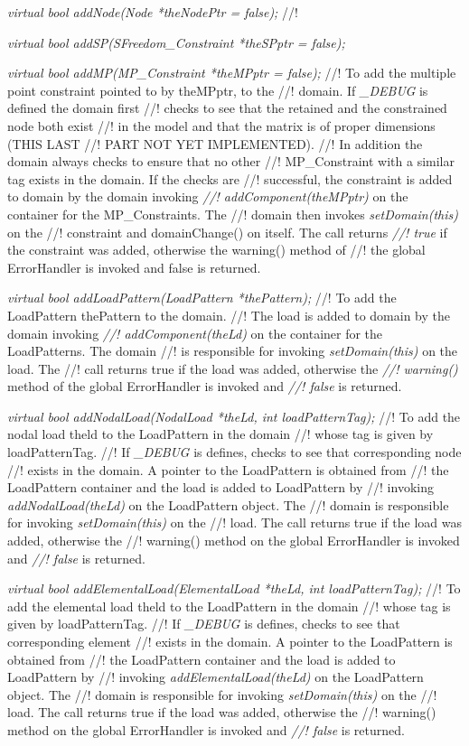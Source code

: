 {\em virtual bool addNode(Node *theNodePtr = false);}  
//! 


{\em virtual bool addSP(SFreedom\_Constraint *theSPptr = false);}  




{\em virtual bool addMP(MP\_Constraint *theMPptr = false);}  
//! To add the multiple point constraint pointed to by theMPptr, to the
//! domain. If {\em \_DEBUG} is defined the domain first
//! checks to see that the retained and the constrained node both exist
//! in the model and that the matrix is of proper dimensions (THIS LAST
//! PART NOT YET IMPLEMENTED). 
//! In addition the domain always checks to ensure that no other
//! MP\_Constraint with a similar tag exists in the domain. If the checks are
//! successful, the constraint is added to domain by the domain invoking {\em
//! addComponent(theMPptr)} on the container for the MP\_Constraints. The
//! domain then invokes {\em setDomain(this)} on the 
//! constraint and domainChange() on itself. The call returns {\em
//! true} if the constraint was added, otherwise the warning() method of
//! the global ErrorHandler is invoked and \p false is returned.


{\em virtual bool addLoadPattern(LoadPattern *thePattern);}   
//! To add the LoadPattern \p thePattern to the domain.
//! The load is added to domain by the domain invoking {\em
//! addComponent(theLd)} on the container for the LoadPatterns. The domain
//! is responsible for invoking {\em setDomain(this)} on the load. The
//! call returns \p true if the load was added, otherwise the {\em
//! warning()} method of the global ErrorHandler is invoked and {\em
//! false} is returned. 

{\em virtual bool addNodalLoad(NodalLoad *theLd, int loadPatternTag);}   
//! To add the nodal load \p theld to the LoadPattern in the domain
//! whose tag is given by \p loadPatternTag.
//! If {\em \_DEBUG} is defines, checks to see that corresponding node
//! exists in the domain. A pointer to the LoadPattern is obtained from
//! the LoadPattern container and the load is added to LoadPattern by
//! invoking {\em addNodalLoad(theLd)} on the LoadPattern object. The
//! domain is responsible for invoking {\em setDomain(this)} on the
//! load. The call returns \p true if the load was added, otherwise the
//! warning() method on the global ErrorHandler is invoked and {\em
//! false} is returned. 


{\em virtual bool addElementalLoad(ElementalLoad *theLd, int loadPatternTag);}   
//! To add the elemental load \p theld to the LoadPattern in the domain
//! whose tag is given by \p loadPatternTag.
//! If {\em \_DEBUG} is defines, checks to see that corresponding element
//! exists in the domain. A pointer to the LoadPattern is obtained from
//! the LoadPattern container and the load is added to LoadPattern by
//! invoking {\em addElementalLoad(theLd)} on the LoadPattern object. The
//! domain is responsible for invoking {\em setDomain(this)} on the
//! load. The call returns \p true if the load was added, otherwise the
//! warning() method on the global ErrorHandler is invoked and {\em
//! false} is returned. 


